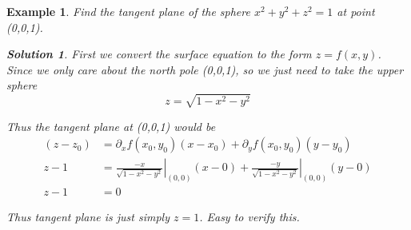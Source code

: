 \documentclass{article}
\newtheorem{ex}{Example}
\newtheorem*{solution}{Solution}
\begin{document}
\begin{ex}
	Find the tangent plane of the sphere $x^2+y^2+z^2=1$ at point (0,0,1).
	\begin{solution}
		First we convert the surface equation to the form $z=f(x,y)$. Since we only care about the north pole (0,0,1), so we just need to take the upper sphere
		\[ z= \sqrt{1-x^2-y^2} \]
		
		Thus the tangent plane at (0,0,1) would be
		\begin{align*}
		(z-z_0) &= \partial_xf(x_0,y_0)(x-x_0) + \partial_yf(x_0,y_0)(y-y_0)\\
		z-1 &= \left.\frac{-x}{\sqrt{1-x^2-y^2}}\right|_{(0,0)} (x-0) 
		+\left.\frac{-y}{\sqrt{1-x^2-y^2}}\right|_{(0,0)}  (y-0)\\
		z-1 &= 0 
		\end{align*}
		
		Thus tangent plane is just simply $z=1$. Easy to verify this. 
	\end{solution}
\end{ex}
\end{document}
